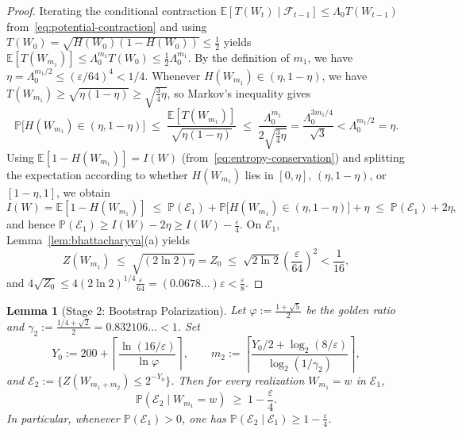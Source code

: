 \documentclass[10pt,a4paper]{article}
\numberwithin{equation}{section}
\theoremstyle{plain}
\newtheorem{lemma}[theorem]{Lemma}
\theoremstyle{definition}
\theoremstyle{remark}
\newcommand{\cE}{\mathcal{E}}
\newcommand{\cF}{\mathcal{F}}
\newcommand{\bE}{\mathbb{E}}
\newcommand{\bP}{\mathbb{P}}
\begin{document}
\begin{proof}
Iterating the conditional contraction $\bE[T(W_t) \mid \cF_{t-1}] \le \Lambda_0 T(W_{t-1})$ from~\eqref{eq:potential-contraction} and using $T(W_0) = \sqrt{H(W_0)(1 - H(W_0))} \le \frac{1}{2}$ yields $\bE[T(W_{m_1})] \le \Lambda_0^{m_1} T(W_0) \le \frac{1}{2} \Lambda_0^{m_1}$. By the definition of $m_1$, we have $\eta = \Lambda_0^{m_1/2} \le (\varepsilon/64)^4 < 1/4$. Whenever $H(W_{m_1}) \in (\eta, 1 - \eta)$, we have $T(W_{m_1}) \ge \sqrt{\eta(1 - \eta)} \ge \sqrt{\frac{3}{4}\eta}$, so Markov's inequality gives
\[
\bP\bigl[H(W_{m_1}) \in (\eta, 1 - \eta)\bigr] \;\le\; \frac{\bE[T(W_{m_1})]}{\sqrt{\eta(1 - \eta)}} \;\le\; \frac{\Lambda_0^{m_1}}{2\sqrt{\frac{3}{4}\eta}} = \frac{\Lambda_0^{3m_1/4}}{\sqrt{3}} < \Lambda_0^{m_1/2} = \eta.
\]
Using $\bE[1 - H(W_{m_1})] = I(W)$ (from~\eqref{eq:entropy-conservation}) and splitting the expectation according to whether $H(W_{m_1})$ lies in $[0, \eta]$, $(\eta, 1 - \eta)$, or $[1 - \eta, 1]$, we obtain
\[
I(W) = \bE[1 - H(W_{m_1})] \;\le\; \bP(\cE_1) + \bP\bigl[H(W_{m_1}) \in (\eta, 1 - \eta)\bigr] + \eta \;\le\; \bP(\cE_1) + 2\eta,
\]
and hence $\bP(\cE_1) \ge I(W) - 2\eta \ge I(W) - \frac{\varepsilon}{4}$. On $\cE_1$, Lemma~\ref{lem:bhattacharyya}(a) yields
\[
Z(W_{m_1}) \;\le\; \sqrt{(2\ln 2)\eta} = Z_0 \;\le\; \sqrt{2\ln 2}\left(\frac{\varepsilon}{64}\right)^2 < \frac{1}{16},
\]
and $4\sqrt{Z_0} \le 4(2\ln 2)^{1/4} \frac{\varepsilon}{64} = (0.0678\ldots)\varepsilon < \frac{\varepsilon}{8}$.
\end{proof}

\begin{lemma}[Stage 2: Bootstrap Polarization]\label{lem:stage2}
Let $\varphi := \frac{1 + \sqrt{5}}{2}$ be the golden ratio and $\gamma_2 := \frac{1/4 + \sqrt{2}}{2} = 0.832106\ldots < 1$. Set
\[
Y_0 := 200 + \left\lceil \frac{\ln(16/\varepsilon)}{\ln \varphi} \right\rceil, \qquad
m_2 := \left\lceil \frac{Y_0/2 + \log_2(8/\varepsilon)}{\log_2(1/\gamma_2)} \right\rceil,
\]
and $\cE_2 := \{Z(W_{m_1 + m_2}) \le 2^{-Y_0}\}$. Then for every realization $W_{m_1} = w$ in $\cE_1$,
\[
\bP(\cE_2 \mid W_{m_1} = w) \;\ge\; 1 - \frac{\varepsilon}{4}.
\]
In particular, whenever $\bP(\cE_1) > 0$, one has $\bP(\cE_2 \mid \cE_1) \ge 1 - \frac{\varepsilon}{4}$.
\end{lemma}
\end{document}
